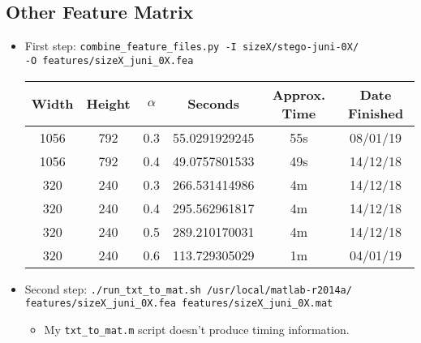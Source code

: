 \documentclass[11pt,a4paper]{report}
\begin{document}
\subsection{Other Feature Matrix}
\begin{itemize}
\item First step: \texttt{combine\_feature\_files.py -I sizeX/stego-juni-0X/} \\
         \texttt{-O features/sizeX\_juni\_0X.fea}
  \begin{center}
  \begin{tabular}{ c c | c | c c c }
  Width & Height & $\alpha$ & Seconds & Approx. Time & Date Finished \\ \hline
  1056 & 792 & 0.3 & 55.0291929245 & 55s & 08/01/19 \\
  1056 & 792 & 0.4 & 49.0757801533 & 49s & 14/12/18 \\
  320 & 240 & 0.3 & 266.531414986 & 4m & 14/12/18 \\
  320 & 240 & 0.4 & 295.562961817 & 4m & 14/12/18 \\
  320 & 240 & 0.5 & 289.210170031 & 4m & 14/12/18 \\
  320 & 240 & 0.6 & 113.729305029 & 1m & 04/01/19 \\
  \end{tabular}
  \end{center}

\item Second step: \texttt{./run\_txt\_to\_mat.sh /usr/local/matlab-r2014a/} \\
         \texttt{features/sizeX\_juni\_0X.fea features/sizeX\_juni\_0X.mat}
  \begin{itemize}
  \item My \texttt{txt\_to\_mat.m} script doesn't produce timing information.
  \end{itemize}
\end{itemize}
\end{document}
